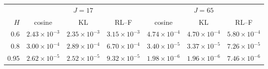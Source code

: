 \begin{tabular}{rcccccc}\toprule
 & \multicolumn{3}{c}{$J=17$} & \multicolumn{3}{c}{$J=65$}\\\cmidrule(lr){2-4}\cmidrule(lr){5-7}
$H$ & cosine & KL & RL--F & cosine & KL & RL--F\\\midrule
0.6 & $2.43\times10^{-3}$ & $2.35\times10^{-3}$ & $3.15\times10^{-3}$ & $4.74\times10^{-4}$ & $4.70\times10^{-4}$ & $5.80\times10^{-4}$ \\
0.8 & $3.00\times10^{-4}$ & $2.89\times10^{-4}$ & $6.70\times10^{-4}$ & $3.40\times10^{-5}$ & $3.37\times10^{-5}$ & $7.26\times10^{-5}$ \\
0.95 & $2.62\times10^{-5}$ & $2.52\times10^{-5}$ & $9.32\times10^{-5}$ & $1.98\times10^{-6}$ & $1.96\times10^{-6}$ & $7.46\times10^{-6}$ \\
\bottomrule\end{tabular}